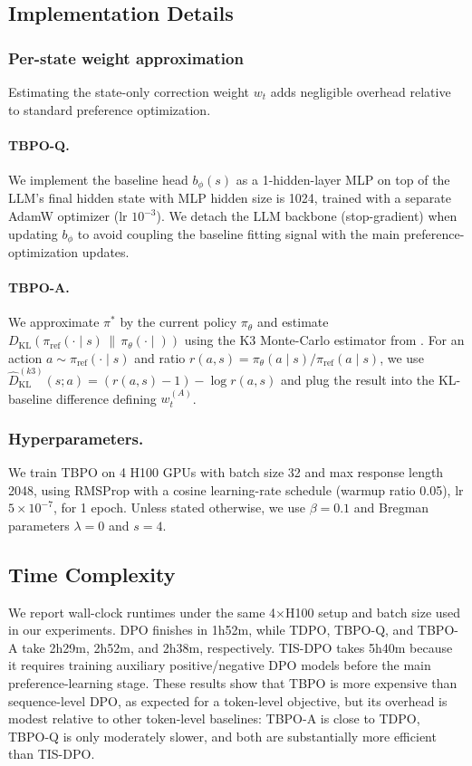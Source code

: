 \documentclass{article}
\theoremstyle{plain}
\theoremstyle{definition}
\theoremstyle{remark}
\begin{document}
\subsection{Implementation Details}
\label{imp_details}
\subsubsection{Per-state weight approximation}
Estimating the state-only correction weight $w_t$ adds negligible overhead relative to standard preference optimization.
\paragraph{TBPO-Q.}
We implement the baseline head $b_\phi(s)$ as a 1-hidden-layer MLP on top of the
LLM's final hidden state with MLP hidden size is 1024, trained with a separate AdamW
optimizer (lr $10^{-3}$). We detach the LLM backbone (stop-gradient) when
updating $b_\phi$ to avoid coupling the baseline fitting signal with the main
preference-optimization updates.
\paragraph{TBPO-A.}
We approximate $\pi^*$ by the current policy $\pi_\theta$ and estimate
$D_{\mathrm{KL}}(\pi_{\mathrm{ref}}(\cdot\mid s)\,\|\,\pi_\theta(\cdot\mid ))$
using the K3 Monte-Carlo estimator from \citet{Schulman2020ApproximatingKL}. For
an action $a\sim\pi_{\mathrm{ref}}(\cdot\mid s)$ and ratio
$r(a,s)=\pi_\theta(a\mid s)/\pi_{\mathrm{ref}}(a\mid s)$, we use
$\widehat{D}_{\mathrm{KL}}^{(k3)}(s;a)=(r(a,s)-1)-\log r(a,s)$ and plug the
result into the KL-baseline difference defining $w_t^{(A)}$.
\subsubsection{Hyperparameters.}
We train TBPO on 4 H100 GPUs with batch size 32 and max response length 2048, using
RMSProp with a cosine learning-rate schedule (warmup ratio 0.05), lr $5\times10^{-7}$,
for 1 epoch. Unless stated otherwise, we use $\beta=0.1$ and Bregman parameters
$\lambda=0$ and $s=4$.

\subsection{Time Complexity}
\label{app:time_complexity}
We report wall-clock runtimes under the same 4$\times$H100 setup and batch
size used in our experiments. DPO finishes in 1h52m, while TDPO, TBPO-Q, and
TBPO-A take 2h29m, 2h52m, and 2h38m, respectively. TIS-DPO takes 5h40m because
it requires training auxiliary positive/negative DPO models before the main
preference-learning stage. These results show that TBPO is more expensive than
sequence-level DPO, as expected for a token-level objective, but its overhead is
modest relative to other token-level baselines: TBPO-A is close to TDPO, TBPO-Q
is only moderately slower, and both are substantially more efficient than
TIS-DPO.
\end{document}
